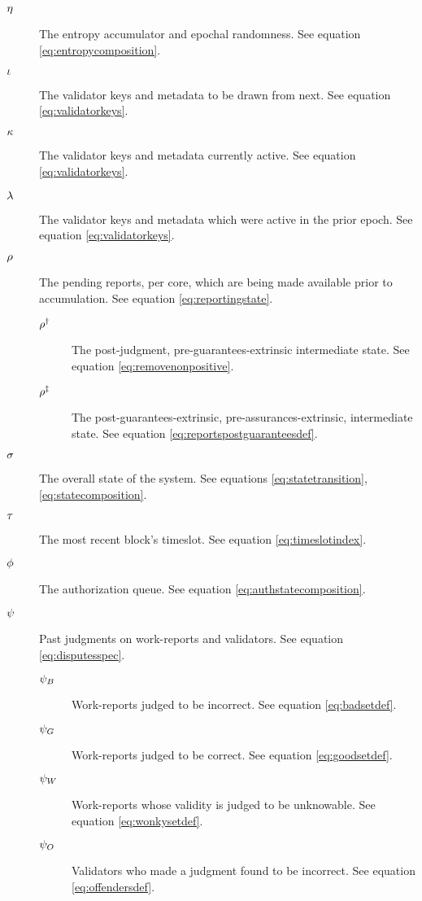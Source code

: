 \begin{description}
\begin{description}
  \end{description}
  \item[$\eta$] The entropy accumulator and epochal randomness. See equation \ref{eq:entropycomposition}.
  \item[$\iota$] The validator keys and metadata to be drawn from next. See equation \ref{eq:validatorkeys}.
  \item[$\kappa$] The validator keys and metadata currently active. See equation \ref{eq:validatorkeys}.
  \item[$\lambda$] The validator keys and metadata which were active in the prior epoch. See equation \ref{eq:validatorkeys}.
  \item[$\rho$] The pending reports, per core, which are being made available prior to accumulation. See equation \ref{eq:reportingstate}.
  \begin{description}
    \item[$\rho^\dagger$] The post-judgment, pre-guarantees-extrinsic intermediate state. See equation \ref{eq:removenonpositive}.
    \item[$\rho^\ddagger$] The post-guarantees-extrinsic, pre-assurances-extrinsic, intermediate state. See equation \ref{eq:reportspostguaranteesdef}.
  \end{description}
  \item[$\sigma$] The overall state of the system. See equations \ref{eq:statetransition}, \ref{eq:statecomposition}.
  \item[$\tau$] The most recent block's timeslot. See equation \ref{eq:timeslotindex}.
  \item[$\phi$] The authorization queue. See equation \ref{eq:authstatecomposition}.
  \item[$\psi$] Past judgments on work-reports and validators. See equation \ref{eq:disputesspec}.
  \begin{description}
    \item[$\psi_B$] Work-reports judged to be incorrect. See equation \ref{eq:badsetdef}.
    \item[$\psi_G$] Work-reports judged to be correct. See equation \ref{eq:goodsetdef}.
    \item[$\psi_W$] Work-reports whose validity is judged to be unknowable. See equation \ref{eq:wonkysetdef}.
    \item[$\psi_O$] Validators who made a judgment found to be incorrect. See equation \ref{eq:offendersdef}.
  \end{description}

\end{description}
